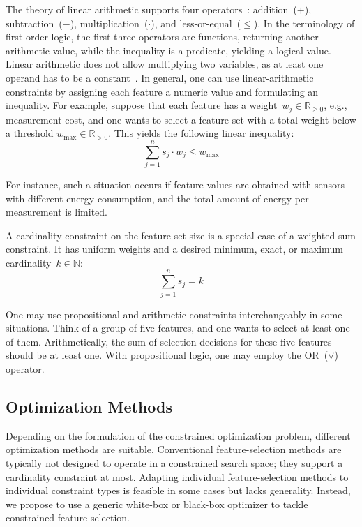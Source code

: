 The theory of linear arithmetic supports four operators~\cite{barrett2018satisfiability}:
addition~($+$), subtraction~($-$), multiplication~($\cdot$), and less-or-equal~($\leq$).
In the terminology of first-order logic, the first three operators are functions, returning another arithmetic value, while the inequality is a predicate, yielding a logical value.
Linear arithmetic does not allow multiplying two variables, as at least one operand has to be a constant~\cite{barrett2018satisfiability}.
In general, one can use linear-arithmetic constraints by assigning each feature a numeric value and formulating an inequality.
For example, suppose that each feature has a weight~$w_j \in \mathbb{R}_{\geq 0}$, e.g., measurement cost, and one wants to select a feature set with a total weight below a threshold $w_{\text{max}} \in \mathbb{R}_{> 0}$.
This yields the following linear inequality: 
%
\begin{equation}
	\sum_{j=1}^n s_j \cdot w_j \leq w_{\text{max}}
\end{equation}

For instance, such a situation occurs if feature values are obtained with sensors with different energy consumption, and the total amount of energy per measurement is limited.

A cardinality constraint on the feature-set size is a special case of a weighted-sum constraint.
It has uniform weights and a desired minimum, exact, or maximum cardinality~$k \in \mathbb{N}$:
%
\begin{equation}
	\sum_{j=1}^n s_j = k
	\label{eq:syn:cardinality}
\end{equation}

One may use propositional and arithmetic constraints interchangeably in some situations.
Think of a group of five features, and one wants to select at least one of them.
Arithmetically, the sum of selection decisions for these five features should be at least one.
With propositional logic, one may employ the OR~($\lor$) operator.

\subsection{Optimization Methods}
\label{sec:syn:approach:optimization}

Depending on the formulation of the constrained optimization problem, different optimization methods are suitable.
Conventional feature-selection methods are typically not designed to operate in a constrained search space; they support a cardinality constraint at most.
Adapting individual feature-selection methods to individual constraint types is feasible in some cases but lacks generality.
Instead, we propose to use a generic white-box or black-box optimizer to tackle constrained feature selection.

